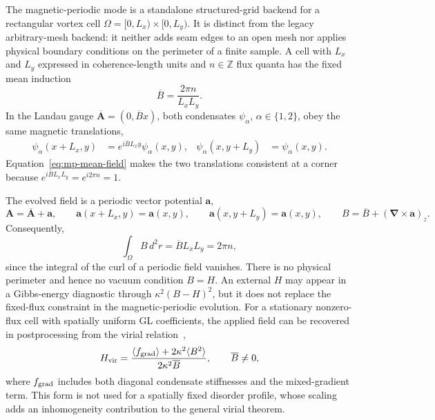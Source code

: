 \documentclass[11pt]{article}
\begin{document}
The magnetic-periodic mode is a standalone structured-grid backend for a
rectangular vortex cell
$\Omega=[0,L_x)\times[0,L_y)$.  It is distinct from the legacy
arbitrary-mesh backend: it neither adds seam edges to an open mesh nor applies
physical boundary conditions on the perimeter of a finite sample.  A cell with
$L_x$ and $L_y$ expressed in coherence-length units and
$n\in\mathbb Z$ flux quanta has the fixed mean induction
\begin{equation}
    \overline B=\frac{2\pi n}{L_xL_y}.
    \label{eq:mp-mean-field}
\end{equation}
In the Landau gauge $\overline{\mathbf A}=(0,\overline Bx)$, both condensates
$\psi_\alpha$, $\alpha\in\{1,2\}$, obey the same magnetic translations,
\begin{align}
    \psi_\alpha(x+L_x,y)
        &=e^{i\overline B L_x y}\psi_\alpha(x,y),
    &\psi_\alpha(x,y+L_y)&=\psi_\alpha(x,y).
    \label{eq:mp-translations}
\end{align}
Equation~\eqref{eq:mp-mean-field} makes the two translations consistent at a
corner because $e^{i\overline B L_xL_y}=e^{i2\pi n}=1$.

The evolved field is a periodic vector potential $\mathbf a$,
\begin{equation}
    \mathbf A=\overline{\mathbf A}+\mathbf a,\qquad
    \mathbf a(x+L_x,y)=\mathbf a(x,y),\qquad
    \mathbf a(x,y+L_y)=\mathbf a(x,y),\qquad
    B=\overline B+(\boldsymbol\nabla\times\mathbf a)_z.
    \label{eq:mp-field-split}
\end{equation}
Consequently,
\begin{equation}
    \int_\Omega B\,d^2r=\overline B L_xL_y=2\pi n,
    \label{eq:mp-fixed-flux}
\end{equation}
since the integral of the curl of a periodic field vanishes.  There is no
physical perimeter and hence no vacuum condition $B=H$.  An external $H$ may
appear in a Gibbs-energy diagnostic through $\kappa^2(B-H)^2$, but it does not
replace the fixed-flux constraint in the magnetic-periodic evolution.
For a stationary nonzero-flux cell with spatially uniform GL coefficients,
the applied field can be recovered in postprocessing from the virial
relation~\cite{Doria1989},
\begin{equation}
    H_{\rm vir}
      =\frac{\langle f_{\rm grad}\rangle
              +2\kappa^2\langle B^2\rangle}
             {2\kappa^2\overline B},
    \qquad \overline B\ne0,
    \label{eq:mp-virial}
\end{equation}
where $f_{\rm grad}$ includes both diagonal condensate stiffnesses and the
mixed-gradient term.  This form is not used for a spatially fixed disorder
profile, whose scaling adds an inhomogeneity contribution to the general
virial theorem.
\end{document}
